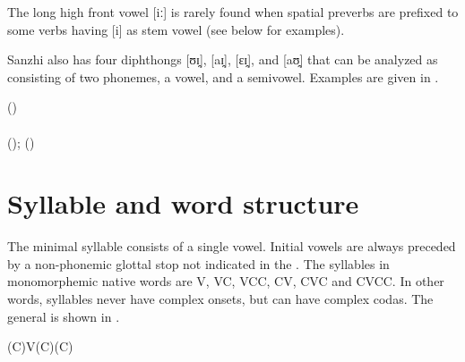 The long high front vowel [iː] is rarely found when spatial preverbs are prefixed to some verbs having [i] as stem vowel (see  below for examples).

Sanzhi also has four diphthongs [ʊɪ̯], [aɪ̯], [εɪ̯], and [aʊ̯] that can be analyzed as consisting of two phonemes, a vowel, and a semivowel. Examples are given in .
%
\begin{exe}
	\ex	\label{ex:diphthongs phon}
	\TabPositions{20em}
		  ()	\tab {} 	\\
		 		\tab  {} 	\\
		  ();  ()	
\end{exe}





\section{Syllable and word structure}
\label{sec:Syllable and word structure}

The minimal syllable consists of a single vowel. Initial vowels are always preceded by a non-phonemic glottal stop not indicated in the . The syllables in monomorphemic native words are V, VC, VCC, CV, CVC and CVCC. In other words, syllables never have complex onsets, but can have complex codas. The general  is shown in .
%
\begin{exe}
	\ex	(C)V(C)(C) \label{ex:syllable structure A phon}
\end{exe}

